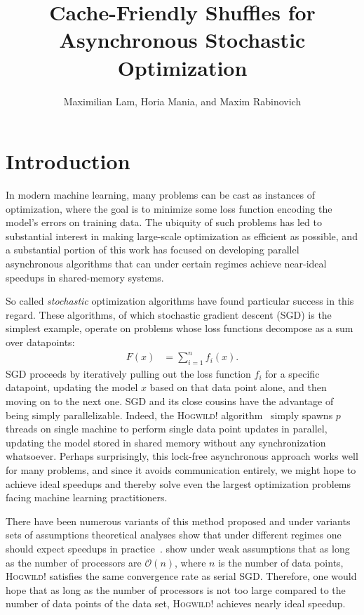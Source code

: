 \documentclass[times,11pt]{article}
\numberwithin{equation}{section}		%
\numberwithin{figure}{section}			%
\numberwithin{table}{section}				%
\newcommand{\HW}{\textsc{Hogwild!}}
\newcommand{\Ocal}{\mathcal{O}}
\begin{document}
\title{Cache-Friendly Shuffles for Asynchronous Stochastic Optimization}
\author{Maximilian Lam, Horia Mania, and Maxim Rabinovich}

\maketitle
\section{Introduction}

In modern machine learning, many problems can be cast as instances of optimization, where the goal is to minimize some loss
function encoding the model's errors on training data. The ubiquity of such problems has led to substantial interest in making large-scale
optimization as efficient as possible, and a substantial portion of this work has focused on 
developing parallel asynchronous  algorithms that can under certain regimes
achieve near-ideal speedups in shared-memory systems.

So called {\it stochastic} optimization algorithms have found particular success in this regard. These algorithms, of which stochastic gradient descent (SGD) is the simplest example, operate
on problems whose loss functions decompose as a sum over datapoints:
\begin{align}
\label{eq:main-loss}
F\left(x\right) & = \sum_{i = 1}^{n} f_{i}\left(x\right) .
\end{align}
SGD proceeds by iteratively pulling out the loss function $f_{i}$ for a specific datapoint, updating the model $x$ based on that data point alone, and then moving on to the next one.
SGD and its close cousins have the advantage of being simply parallelizable. Indeed, the \HW{} algorithm~\cite{niu2011hogwild} simply spawns $p$ threads on single machine to perform single data point updates in parallel, updating the model stored in shared memory without any synchronization whatsoever. Perhaps surprisingly, this lock-free asynchronous approach works well for many problems, and since it avoids communication entirely, we might hope to achieve ideal speedups and thereby solve even the largest optimization problems facing machine learning practitioners.

There have been numerous variants of this method proposed and under variants sets of assumptions theoretical analyses show that under different regimes one should expect speedups in practice~\cite{niu2011hogwild, lian2015asynchronous, reddi2015variance, de2015taming, liu2015asynchronous}. \citet{mania2015perturbed} show under weak assumptions that as long as the number of processors are $\Ocal(n)$, where $n$ is the number of data points, \HW{} satisfies the same convergence rate as serial SGD. Therefore, one would hope that as long as the number of processors is not too large compared to the number of data points of the data set, \HW{} achieves nearly ideal speedup. 
\end{document}

